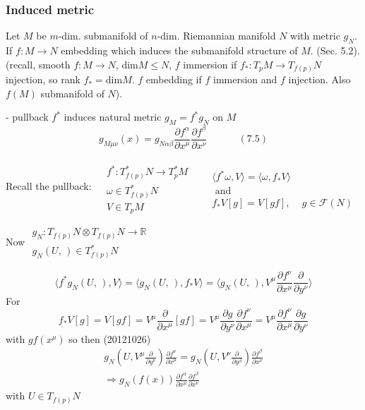 \documentclass[twoside]{amsart}
\begin{document}
\subsubsection{ Induced metric }

Let $M$ be $m$-dim. submanifold of $n$-dim. Riemannian manifold $N$ with metric $g_N$.  \\
If $f: M \to N$ embedding which induces the submanifold structure of $M$.  (Sec. 5.2).  \\
(recall, smooth $f:M\to N$, $\text{dim}{ M } \leq N$, $f$ immersion if $f_*: T_pM \to T_{f(p)}N$ injection, so rank $f_* = \text{dim}{M}$.  $f$ embedding if $f$ immersion and $f$ injection.  Also $f(M)$ submanifold of $N$).  

- pullback $f^*$ induces natural metric $g_M = f^* g_N$ on $M$
\begin{equation}
  g_{M \mu \nu}(x) = g_{ N \alpha \beta} \frac{ \partial f^{\alpha }}{ \partial x^{\mu }} \frac{ \partial f^{\beta} }{ \partial x^{\nu }} \quad \quad \quad \, (7.5)
\end{equation}

Recall the pullback: $\begin{aligned} & \quad \\ 
  & f^* : T^*_{f(p)}N \to T_p^*M \\
  & \omega \in T^*_{f(p)}N \\
  & V \in T_p M \end{aligned}$ \quad \quad \, $\begin{aligned} & \quad \\ 
  & \langle f^* \omega , V \rangle = \langle \omega, f_* V \rangle \\
  & \text{ and } \\
  & f_* V[g] = V[gf], \quad \, g\in \mathcal{F}(N) \end{aligned}$

Now $\begin{gathered} 
  g_N: T_{f(p) } N \otimes T_{f(p)} N \to \mathbb{R} \\
  g_N(U, \, ) \in T^*_{f(p)} N \end{gathered}$ 

\[
\langle f^* g_N(U, \, ) , V \rangle = \langle g_N(U, \, ), f_* V \rangle  = \langle g_N(U, \, ), V^{\mu} \frac{ \partial f^{\nu} }{ \partial x^{\mu} } \frac{ \partial }{ \partial y^{\nu}} \rangle 
\]
For 
\[
f_* V[g] = V[gf] = V^{\mu} \frac{ \partial }{ \partial x^{\mu} } [gf] = V^{\mu} \frac{ \partial g}{ \partial y^{\nu}} \frac{ \partial f^{\nu } }{ \partial x^{\mu }} = V^{\mu} \frac{ \partial f^{\nu }}{ \partial x^{\mu} } \frac{ \partial g}{ \partial y^{\nu} }
\]
with $gf(x^{\mu})$
so then (20121026)
\[
\begin{gathered}
  g_N\left(U, V^{\mu} \frac{ \partial }{ \partial y^{\nu }} \right) \frac{ \partial f^{\nu} }{ \partial x^{\mu }} = g_N(U, V^{\nu} \frac{ \partial }{ \partial y^{\beta} } ) \frac{ \partial f^{\beta} }{ \partial x^{\nu }} \\ 
  \Longrightarrow g_N(f(x)) \frac{ \partial f^{\alpha }}{ \partial x^{\mu} } \frac{ \partial f^{\beta}}{ \partial x^{\nu }}
\end{gathered}
\]
with $U \in T_{f(p)}N$
\end{document}

